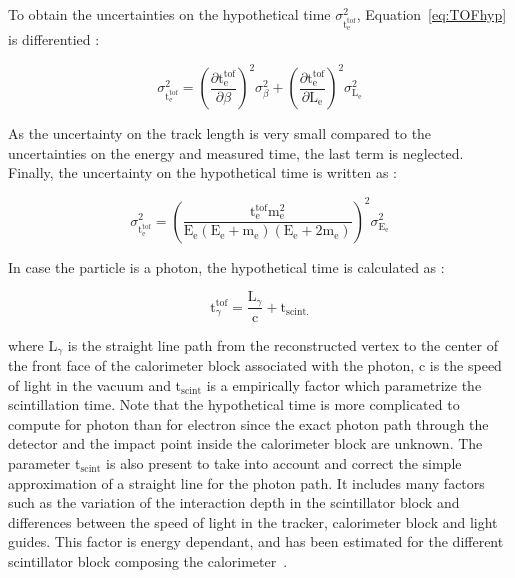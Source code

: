 \documentclass[main.tex]{subfiles}
\begin{document}
\bigskip


\NI To obtain the uncertainties on the hypothetical time $\sigma^\text{2}_{\text{t}_{\text{e}}^{\text{tof}}}$, Equation~\ref{eq:TOFhyp} is differentied : 


\begin{equation}
\sigma^\text{2}_{\text{t}_{\text{e}}^{\text{tof}}} = \left( \frac{\partial \text{t}_\text{e}^{\text{tof}}}{\partial \beta}  \right)^\text{2} \sigma^\text{2}_\beta + \left( \frac{\partial \text{t}_\text{e}^{\text{tof}}}{\partial \text{L}_\text{e}}  \right)^\text{2} \sigma^\text{2}_{\text{L}_\text{e}}
\end{equation}


\bigskip


\NI As the uncertainty on the track length is very small compared to the uncertainties on the energy and measured time, the last term is neglected. Finally, the uncertainty on the hypothetical time is written as : 


\begin{equation}
\sigma^\text{2}_{\text{t}_{\text{e}}^{\text{tof}}} = \left( \frac{\text{t}_\text{e}^{\text{tof}} \text{m}_\text{e}^\text{2}}{\text{E}_\text{e} (\text{E}_\text{e} + \text{m}_\text{e})(\text{E}_\text{e} + \text{2m}_\text{e})}  \right) ^\text{2} \sigma^\text{2}_{\text{E}_\text{e}}
\end{equation}


\bigskip


\NI In case the particle is a photon, the hypothetical time is calculated as : 


\begin{equation}
\text{t}_\gamma^{\text{tof}} = \frac{\text{L}_\gamma}{\text{c}} + \text{t}_{\text{scint.}} 
\end{equation}

\bigskip


\NI where L$_{\gamma}$ is the straight line path from the reconstructed vertex to the center of the front face of the calorimeter block associated with the photon, c is the speed of light in the vacuum and t$_{\text{scint}}$ is a empirically factor which parametrize the scintillation time. Note that the hypothetical time is more complicated to compute for photon than for electron since the exact photon path through the detector and the impact point inside the calorimeter block are unknown. The parameter t$_{\text{scint}}$ is also present to take into account and correct the simple approximation of a straight line for the photon path. It includes many factors such as the variation of the interaction depth in the scintillator block and differences between the speed of light in the tracker, calorimeter block and light guides. This factor is energy dependant, and has been estimated for the different scintillator block composing the calorimeter~\cite{GammaReconstructionHereward}.
\end{document}
